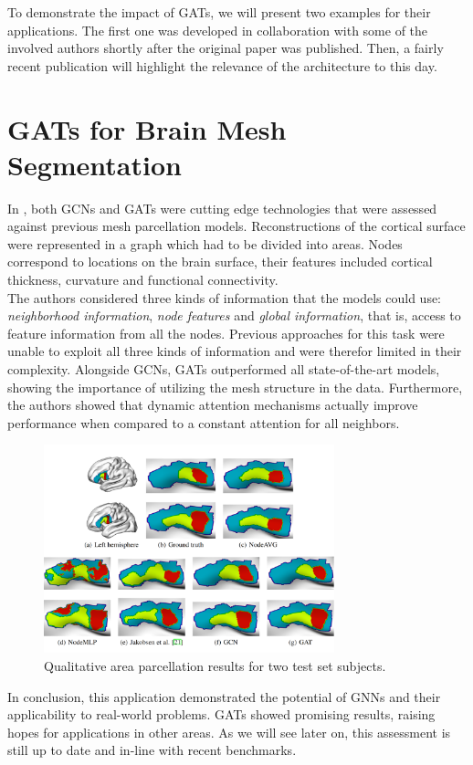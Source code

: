 \label{chapter:applications}

To demonstrate the impact of GATs, we will present two examples for their applications. The first one was developed in collaboration with some of the involved authors shortly after the original paper was published. Then, a fairly recent publication will highlight the relevance of the architecture to this day.

\section*{GATs for Brain Mesh Segmentation}
In \cite{Cucurull2018ConvolutionalNN}, both GCNs and GATs were cutting edge technologies that were assessed against previous mesh parcellation models. Reconstructions of the cortical surface were represented in a graph which had to be divided into areas. Nodes correspond to locations on the brain surface, their features included cortical thickness, curvature and functional connectivity. \\

The authors considered three kinds of information that the models could use: \textit{neighborhood information}, \textit{node features} and \textit{global information}, that is, access to feature information from all the nodes. 
Previous approaches for this task were unable to exploit all three kinds of information and were therefor limited in their complexity. Alongside GCNs, GATs outperformed all state-of-the-art models, showing the importance of utilizing the mesh structure in the data. Furthermore, the authors showed that dynamic attention mechanisms actually improve performance when compared to a constant attention for all neighbors.

\begin{figure}[h]
    \centering
    \includegraphics[width=0.75\textwidth]{img/brain_mesh.PNG}
    \caption{Qualitative area parcellation results for two test set subjects. \cite{Cucurull2018ConvolutionalNN}}
\end{figure}

In conclusion, this application demonstrated the potential of GNNs and their applicability to real-world problems. GATs showed promising results, raising hopes for applications in other areas. As we will see later on, this assessment is still up to date and in-line with recent benchmarks.\\~\\
